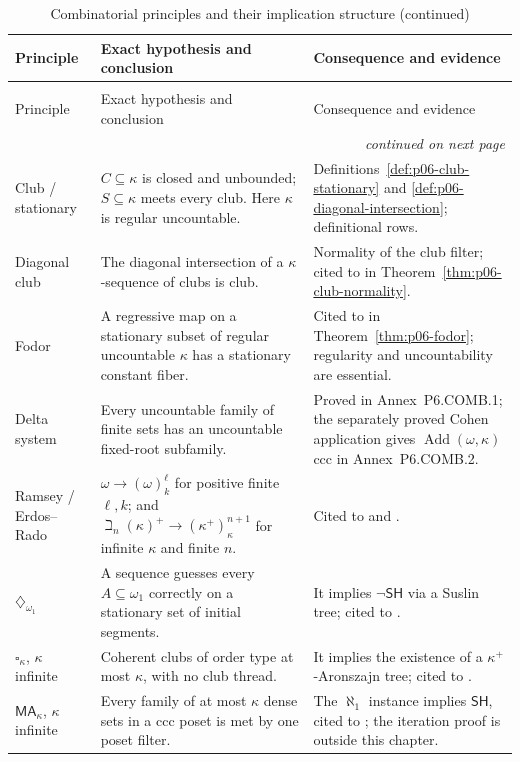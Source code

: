 \begingroup\footnotesize
\begin{longtable}{@{}p{}p{}p{}@{}}
\caption{Combinatorial principles and their implication structure.}\label{tab:p06-combinatorial-principles}\\
\toprule
Principle & Exact hypothesis and conclusion & Consequence and evidence \\
\midrule
\endfirsthead
\caption[]{Combinatorial principles and their implication structure (continued)}\\
\toprule
Principle & Exact hypothesis and conclusion & Consequence and evidence \\
\midrule
\endhead
\midrule\multicolumn{3}{r}{\emph{continued on next page}}\\
\endfoot
\endlastfoot
Club / stationary &
\(C\subseteq\kappa\) is closed and unbounded; \(S\subseteq\kappa\) meets
every club.  Here \(\kappa\) is regular uncountable. &
Definitions~\ref{def:p06-club-stationary} and
\ref{def:p06-diagonal-intersection}; definitional rows. \\
\addlinespace
Diagonal club &
The diagonal intersection of a \(\kappa\)-sequence of clubs is club. &
Normality of the club filter; cited to \textcite{Jech2003} in
Theorem~\ref{thm:p06-club-normality}. \\
\addlinespace
Fodor &
A regressive map on a stationary subset of regular uncountable \(\kappa\)
has a stationary constant fiber. &
Cited to \textcite{Fodor1956} in Theorem~\ref{thm:p06-fodor}; regularity and
uncountability are essential. \\
\addlinespace
Delta system &
Every uncountable family of finite sets has an uncountable fixed-root
subfamily. &
Proved in Annex~P6.COMB.1; the separately proved Cohen application gives
\(\operatorname{Add}(\omega,\kappa)\) ccc in Annex~P6.COMB.2. \\
\addlinespace
Ramsey / Erdos--Rado &
\(\omega\longrightarrow(\omega)^\ell_k\) for positive finite \(\ell,k\); and
\(\beth_n(\kappa)^+\longrightarrow(\kappa^+)^{n+1}_\kappa\) for infinite
\(\kappa\) and finite \(n\). &
Cited to \textcite{Ramsey1930} and \textcite{ErdosRado1956}. \\
\addlinespace
\(\diamondsuit_{\omega_1}\) &
A sequence guesses every \(A\subseteq\omega_1\) correctly on a stationary
set of initial segments. &
It implies \(\neg\mathsf{SH}\) via a Suslin tree; cited to
\textcite{Jensen1972FineStructure}. \\
\addlinespace
\(\square_\kappa\), \(\kappa\) infinite &
Coherent clubs of order type at most \(\kappa\), with no club thread. &
It implies the existence of a \(\kappa^+\)-Aronszajn tree; cited to
\textcite{Jensen1972FineStructure}. \\
\addlinespace
\(\mathsf{MA}_\kappa\), \(\kappa\) infinite &
Every family of at most \(\kappa\) dense sets in a ccc poset is met by one
poset filter. &
The \(\aleph_1\) instance implies \(\mathsf{SH}\), cited to
\textcite{MartinSolovay1970}; the iteration proof is outside this chapter. \\
\bottomrule
\end{longtable}
\endgroup

